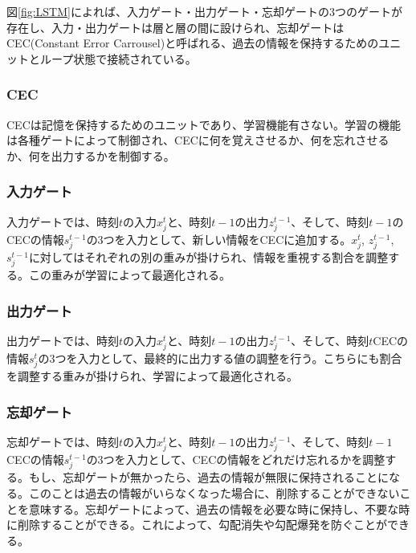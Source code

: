 \documentclass{ltjsarticle}
\begin{document}
\newpage

図\ref{fig:LSTM}によれば、入力ゲート・出力ゲート・忘却ゲートの3つのゲートが存在し、入力・出力ゲートは層と層の間に設けられ、忘却ゲートはCEC(Constant Error Carrousel)と呼ばれる、過去の情報を保持するためのユニットとループ状態で接続されている。
\subsubsection{CEC}
CECは記憶を保持するためのユニットであり、学習機能有さない。学習の機能は各種ゲートによって制御され、CECに何を覚えさせるか、何を忘れさせるか、何を出力するかを制御する。
\subsubsection{入力ゲート}
入力ゲートでは、時刻$t$の入力$x_j^t$と、時刻$t-1$の出力$z_j^{t-1}$、そして、時刻$t-1$のCECの情報$s_j^{t-1}$の3つを入力として、新しい情報をCECに追加する。$x_j^t$, $z_j^{t-1}$, $s_j^{t-1}$に対してはそれぞれの別の重みが掛けられ、情報を重視する割合を調整する。この重みが学習によって最適化される。
\subsubsection{出力ゲート}
出力ゲートでは、時刻$t$の入力$x_j^t$と、時刻$t-1$の出力$z_j^{t-1}$、そして、時刻$t$CECの情報$s_j^{t}$の3つを入力として、最終的に出力する値の調整を行う。こちらにも割合を調整する重みが掛けられ、学習によって最適化される。
\subsubsection{忘却ゲート}
忘却ゲートでは、時刻$t$の入力$x_j^t$と、時刻$t-1$の出力$z_j^{t-1}$、そして、時刻$t-1$CECの情報$s_j^{t-1}$の3つを入力として、CECの情報をどれだけ忘れるかを調整する。もし、忘却ゲートが無かったら、過去の情報が無限に保持されることになる。このことは過去の情報がいらなくなった場合に、削除することができないことを意味する。忘却ゲートによって、過去の情報を必要な時に保持し、不要な時に削除することができる。これによって、勾配消失や勾配爆発を防ぐことができる。

\newpage
\end{document}
